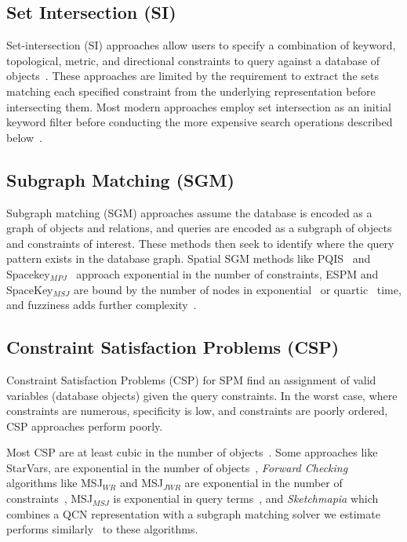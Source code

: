 \subsection{Set Intersection (SI)}
\par{  
    Set-intersection (SI) approaches allow users to specify a combination of keyword, topological, metric, and directional constraints to query against a database of objects~\cite{DiLoreto1996, Soffer1996, Soffer1997, Soffer1998a, Soffer1999}.
    These approaches are limited by the requirement to extract the sets matching each specified constraint from the underlying representation before intersecting them. 
    Most modern approaches employ set intersection as an initial keyword filter before conducting the more expensive search operations described below~\cite{Schwering2014, Osul2023}.
    

\subsection{Subgraph Matching (SGM)}
\par{
   
    Subgraph matching (SGM) approaches assume the database is encoded as a graph of objects and relations, and queries are encoded as a subgraph of objects and constraints of interest.
    These methods then seek to identify where the query pattern exists in the database graph. 
    Spatial SGM methods like PQIS~\cite{Folkers2000} and Spacekey$_{MPJ}$~\cite{Fang2019} approach exponential in the number of constraints, ESPM and SpaceKey$_{MSJ}$ are bound by the number of nodes in exponential~\cite{Chen2019} or quartic~\cite{Fang2019} time, and fuzziness adds further complexity~\cite{Fang2019}.
    }
    
\subsection{Constraint Satisfaction Problems (CSP)}
    

    \par{
    Constraint Satisfaction Problems (CSP) for SPM find an assignment of valid variables (database objects) given the query constraints.
    In the worst case, where constraints are numerous, specificity is low, and constraints are poorly ordered, CSP approaches perform poorly.
    
    Most CSP are at least cubic in the number of objects~\cite{Dylla2017}.
    Some approaches like StarVars, are exponential in the number of objects~\cite{Lee2013}, \textit{Forward Checking} algorithms like MSJ$_{WR}$ and MSJ$_{JWR}$  are exponential in the number of constraints~\cite{Papadias1998}, MSJ$_{MSJ}$  is exponential in query terms~\cite{Papadias1998}, and \textit{Sketchmapia} which combines a QCN representation with a subgraph matching solver we estimate performs similarly~\cite{Schwering2014, Jan2015} to these algorithms.
   

}}
